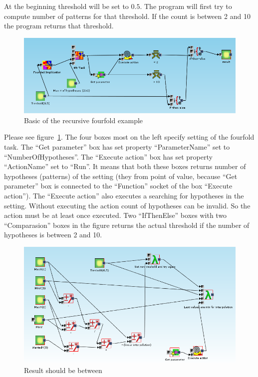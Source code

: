 \documentclass[a4paper,12pt]{book}
\begin{document}
At the beginning threshold will be set to $0.5$. The program will first try to compute number of patterns for that threshold. If the count is between 2 and 10 the program returns that threshold.   

\begin{figure}
	\includegraphics[width=1\textwidth]{exampleMainMiningPart}
	\caption{Basic of the recursive fourfold example}
	\label{fig:basicRecursiveExample}
\end{figure}

Please see figure~\ref{fig:basicRecursiveExample}. The four boxes most on the left specify setting of the fourfold task. The ``Get parameter'' box has set property ``ParameterName'' set to ``NumberOfHypotheses''. The ``Execute action'' box has set property ``ActionName'' set to ``Run''. It means that both these boxes returns number of hypotheses (patterns) of the setting (they from point of value, because ``Get parameter'' box is connected to the ``Function'' socket of the box ``Execute action''). The ``Execute action'' also executes a searching for hypotheses in the setting. Without executing the action count of hypotheses can be invalid. So the action must be at least once executed. Two ``IfThenElse'' boxes with two ``Comparasion'' boxes in the figure returns the actual threshold if the number of hypotheses is between 2 and 10.

\begin{figure}
	\includegraphics[width=1\textwidth]{exampleMainRecursionPart}
	\caption{Result should be between}
	\label{fig:resultBetween}
\end{figure}
\end{document}
